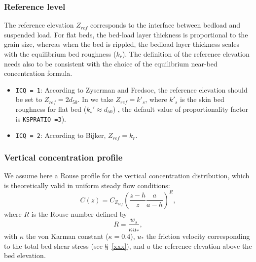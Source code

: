 \subsubsection{Reference level}
The reference elevation $Z_{ref}$ corresponds to the interface
between bedload and suspended load. For flat beds, the bed-load layer
thickness is proportional to the grain size, whereas when the bed is
rippled, the bedload layer thickness scales with the equilibrium bed
roughness ($k_r$). The definition of the reference elevation needs also to be consistent with
the choice of the equilibrium near-bed concentration formula. 

\begin{itemize}
\item \texttt{ICQ = 1}: According to Zyserman and Fredsoe, the reference
elevation should be set to $Z_{ref} = 2d_{50}$. In \sisyphe we take $Z_{ref}=k'_s$, 
where $k'_s$ is the skin bed roughness for flat bed ($k_s' \approx d_{50}$) 
, the default value of proportionality factor is \texttt{KSPRATIO =3}). 
\item \texttt{ICQ = 2}: According to Bijker, $Z_{ref} = k_r$.
\end{itemize}

\subsubsection{Vertical concentration profile}
We assume here a Rouse profile for the vertical concentration distribution,
which is theoretically valid in uniform steady flow conditions:
\begin{equation}\label{eq:Rouseprofile}
C(z)=C_{Z_{ref}}\left(\frac{z-h}{z}\frac{a}{a-h}\right)^R, 
\end{equation}
where $R$ is the Rouse number defined by
\begin{equation}\label{eq:R}
R=\frac{w_s}{\kappa u_*}, 
\end{equation}
with $\kappa$ the von Karman constant ($\kappa = 0.4$), $u_*$ the
friction velocity corresponding to the total bed shear stress (see \S~\ref{xxx}), and $a$ the reference elevation above the bed elevation.

